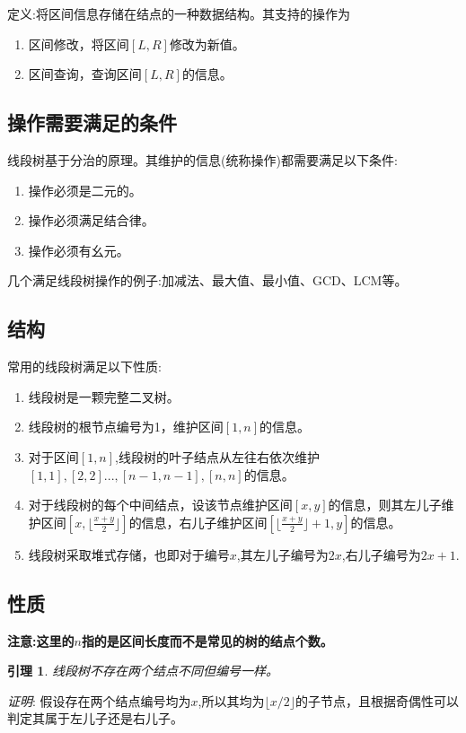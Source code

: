 \documentclass{article}
\newtheorem{lemma}{引理}
\begin{document}
定义:将区间信息存储在结点的一种数据结构。其支持的操作为
\begin{enumerate}
    \item 区间修改，将区间$[L,R]$修改为新值。
    \item 区间查询，查询区间$[L,R]$的信息。
\end{enumerate}

\subsection{操作需要满足的条件}
线段树基于分治的原理。其维护的信息(统称操作)都需要满足以下条件:

\begin{enumerate}
    \item 操作必须是二元的。
    \item 操作必须满足结合律。
    \item 操作必须有幺元。
\end{enumerate}

几个满足线段树操作的例子:加减法、最大值、最小值、GCD、LCM等。

\subsection{结构}
常用的线段树满足以下性质:

\begin{enumerate}
    \item 线段树是一颗完整二叉树。
    \item 线段树的根节点编号为1，维护区间$[1,n]$的信息。
    \item 对于区间$[1,n]$,线段树的叶子结点从左往右依次维护$[1,1],[2,2]...,[n-1,n-1],[n,n]$的信息。
    \item 对于线段树的每个中间结点，设该节点维护区间$[x,y]$的信息，则其左儿子维护区间$[x,  \lfloor \frac{x+y}{2}\rfloor]$的信息，右儿子维护区间$[\lfloor \frac{x+y}{2} \rfloor +1,y]$的信息。
    \item 线段树采取堆式存储，也即对于编号$x$,其左儿子编号为$2x$,右儿子编号为$2x+1$.
\end{enumerate}

\subsection{性质}
\textbf{注意:这里的$n$指的是区间长度而不是常见的树的结点个数。}

\begin{lemma}
    线段树不存在两个结点不同但编号一样。
\end{lemma}
\emph{证明}:
假设存在两个结点编号均为$x$,所以其均为$\lfloor x/2 \rfloor $的子节点，且根据奇偶性可以判定其属于左儿子还是右儿子。
\end{document}
